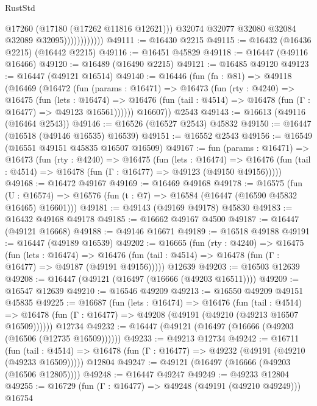 \begin{lexlean}{RustStd}
\begin{coremodule}
                              @17260
                              (@17180 (@17262 @11816 @12621)))
                            @32074
                            @32077
                            @32080
                            @32084
                            @32089
                            @32095))))))))))))
@49111 := @16430 @2215
@49115 := @16432 (@16436 @2215) (@16442 @2215)
@49116 := @16451 @45829
@49118 := @16447 (@49116 @16466)
@49120 := @16489 (@16490 @2215)
@49121 := @16485 @49120
@49123 := @16447 (@49121 @16514)
@49140 := @16446
    (fun (fn : @81) =>
    @49118
      (@16469
        (@16472
          (fun (params : @16471) =>
          @16473
            (fun (rty : @4240) =>
            @16475
              (fun (lets : @16474) =>
              @16476 (fun (tail : @4514) => @16478 (fun (Γ : @16477) => @49123 @16561))))))
        @16607))
    @2543
@49143 := @16613 (@49116 (@16464 @2543))
@49146 := @16526 (@16527 @2543) @45832
@49150 := @16447 (@16518 (@49146 @16535) @16539)
@49151 := @16552 @2543
@49156 := @16549 (@16551 @49151 @45835 @16507 @16509)
@49167 := fun (params : @16471) =>
  @16473
    (fun (rty : @4240) =>
    @16475
      (fun (lets : @16474) =>
      @16476 (fun (tail : @4514) => @16478 (fun (Γ : @16477) => @49123 (@49150 @49156)))))
@49168 := @16472 @49167
@49169 := @16469 @49168
@49178 := @16575
    (fun (U : @16574) => @16576 (fun (t : @7) => @16584 (@16447 (@16590 @45832 @16465) @16601)))
@49181 := @49143 (@49169 @49178) @45830
@49183 := @16432 @49168 @49178
@49185 := @16662 @49167 @4500
@49187 := @16447 (@49121 @16668)
@49188 := @49146 @16671
@49189 := @16518 @49188
@49191 := @16447 (@49189 @16539)
@49202 := @16665
    (fun (rty : @4240) =>
    @16475
      (fun (lets : @16474) =>
      @16476 (fun (tail : @4514) => @16478 (fun (Γ : @16477) => @49187 (@49191 @49156)))))
    @12639
@49203 := @16503 @12639
@49208 := @16447 (@49121 (@16497 (@16666 (@49203 @16511))))
@49209 := @16547 @12639
@49210 := @16546 @49209
@49213 := @16550 @49209 @49151 @45835
@49225 := @16687
    (fun (lets : @16474) =>
    @16476
      (fun (tail : @4514) =>
      @16478 (fun (Γ : @16477) => @49208 (@49191 (@49210 (@49213 @16507 @16509))))))
    @12734
@49232 := @16447 (@49121 (@16497 (@16666 (@49203 (@16506 (@12735 @16509))))))
@49233 := @49213 @12734
@49242 := @16711
    (fun (tail : @4514) => @16478 (fun (Γ : @16477) => @49232 (@49191 (@49210 (@49233 @16509)))))
    @12804
@49247 := @49121 (@16497 (@16666 (@49203 (@16506 @12805))))
@49248 := @16447 @49247
@49249 := @49233 @12804
@49255 := @16729 (fun (Γ : @16477) => @49248 (@49191 (@49210 @49249))) @16754

\end{coremodule}
\end{lexlean}
